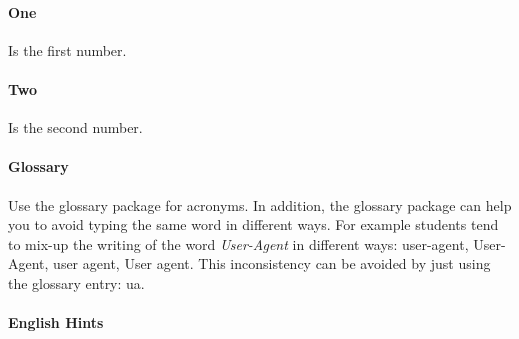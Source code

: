 \paragraph{One} Is the first number.

\paragraph{Two} Is the second number.

\paragraph{Glossary}
Use the glossary package for acronyms.
In addition, the glossary package can help you to avoid typing the same word in different ways.
For example students tend to mix-up the writing of the word \emph{User-Agent} in different ways: user-agent, User-Agent, user agent, User agent.
This inconsistency can be avoided by just using the glossary entry: \gls{ua}.

\paragraph{English Hints}

